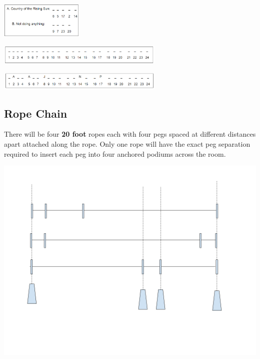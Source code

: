 \documentclass[12pt]{article}
\begin{document}
\begin{center}
\includegraphics[width=4cm]{./img/acrostic-1.png}
\end{center}

\begin{center}
\includegraphics[width=8cm]{./img/acrostic-2.png}
\end{center}

\begin{center}
\includegraphics[width=8cm]{./img/acrostic-3.png}
\end{center}

\subsection{Rope Chain}
\label{sec:orgc2e7179}
There will be four \textbf{20 foot} ropes each with four pegs spaced at different distances apart attached along the rope. Only one rope will have the exact peg separation required to insert each peg into four anchored podiums across the room.

\begin{center}
\includegraphics[width=.9\linewidth]{./img/pt-rc-001.png}
\end{center}
\end{document}
